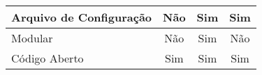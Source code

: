 \begin{table}[H]
\begin{tabular}{l|c|c|c}
Arquivo de Configuração                                                             & Não                                                                                       & Sim            & Sim               \\ \hline
Modular                                                                             & Não                                                                                       & Sim            & Não               \\ \hline
Código Aberto                                                                       & Sim                                                                                       & Sim            & Sim
\end{tabular}
\end{table}
\vspace*{-0,9cm}

